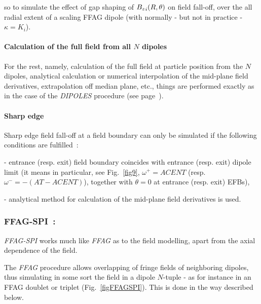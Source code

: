 \noindent  so to simulate the effect of gap shaping of $ {B_z}_i(R,\theta)$ on 
field fall-off,  over the 
all radial extent of a scaling FFAG dipole (with normally - but not in practice - $\kappa = K_i$). 
 

\bigskip

\paragraph{Calculation of the full field from all $N$ dipoles}

For the rest, namely, calculation of the full field at particle position from the $N$ dipoles, 
analytical   calculation or numerical interpolation of the  mid-plane field derivatives, 
extrapolation off median plane, etc., things are performed exactly as in the case of the 
 \textsl{DIPOLES} procedure (see page~\pageref{FFatAP}). 




\bigskip

\paragraph{Sharp edge} 

\noindent Sharp edge field fall-off at a field boundary  can only be simulated if the following conditions are fulfilled~: 

- entrance (resp. exit)  field boundary  coincides with entrance (resp. exit) 
dipole limit (it means in particular, see Fig.~\ref{fig9},  
$\omega^+= ACENT$ (resp. $\omega^- = -(AT-ACENT)$), 
together with $\theta=0$ at entrance (resp. exit) EFBs), 

- analytical method for calculation of the  mid-plane field derivatives is used. 







\newpage


\subsubsection*{FFAG-SPI~: \FFAGSPITitl} \label{FFAG-SPI} 
\medskip

\noindent \textsl{FFAG-SPI} works much like \textsl{FFAG} 
as to the field modelling, apart from the axial  dependence of the field. 

\bigskip

\noindent The \textsl{FFAG} procedure allows overlapping of fringe fields of neighboring dipoles, 
thus simulating in some sort the field in a dipole $N$-tuple - as for instance in an FFAG doublet 
or triplet (Fig.~\ref{figFFAGSPI}). This is done in the way described below. 


